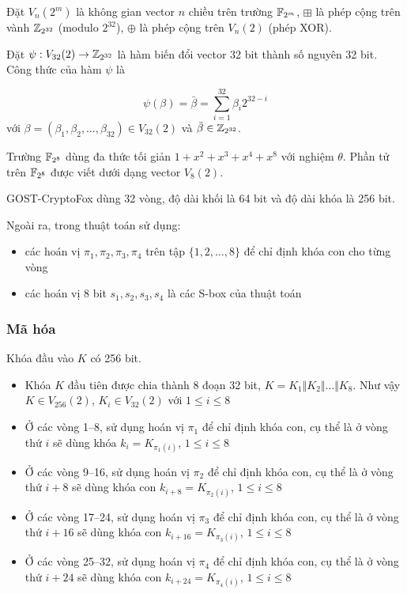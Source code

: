 Đặt $V_{n}(2^m)$ là không gian vector $n$ chiều trên trường $\mathbb{F}_{2^m}$, $\boxplus$ là phép cộng trên vành $\mathbb{Z}_{2^{32}}$ (modulo $2^{32}$), $\oplus$ là phép cộng trên $V_{n}(2)$ (phép XOR).

Đặt $\psi : V_{32}(2) \to \mathbb{Z}_{2^{32}}$ là hàm biến đổi vector 32 bit thành số nguyên 32 bit. Công thức của hàm $\psi$ là

\begin{equation*}
    \psi(\beta) = \bar{\beta} = \sum_{i=1}^{32} \beta_i 2^{32-i}
\end{equation*}
với $\beta = (\beta_1, \beta_2, \ldots, \beta_{32}) \in V_{32}(2)$ và $\bar{\beta} \in \mathbb{Z}_{2^{32}}$.

Trường $\mathbb{F}_{2^8}$ dùng đa thức tối giản $1 + x^2 + x^3 + x^4 + x^8$ với nghiệm $\theta$. Phần tử trên $\mathbb{F}_{2^8}$ được viết dưới dạng vector $V_8(2)$.

GOST-CryptoFox dùng 32 vòng, độ dài khối là 64 bit và độ dài khóa là 256 bit.

Ngoài ra, trong thuật toán sử dụng:

\begin{itemize}
    \item các hoán vị $\pi_1, \pi_2, \pi_3, \pi_4$ trên tập $\{ 1, 2, \ldots, 8 \}$ để chỉ định khóa con cho từng vòng
    \item các hoán vị 8 bit $s_1, s_2, s_3, s_4$ là các S-box của thuật toán
\end{itemize}

\subsubsection*{Mã hóa}

Khóa đầu vào $K$ có 256 bit.

\begin{itemize}
    \item Khóa $K$ đầu tiên được chia thành 8 đoạn 32 bit, $K = K_1 \Vert K_2 \Vert \ldots \Vert K_8$. Như vậy $K \in V_{256}(2)$, $K_i \in V_{32}(2)$ với $1 \leqslant i \leqslant 8$
    \item Ở các vòng 1--8, sử dụng hoán vị $\pi_1$ để chỉ định khóa con, cụ thể là ở vòng thứ $i$ sẽ dùng khóa $k_i = K_{\pi_1(i)}$, $1 \leqslant i \leqslant 8$
    \item Ở các vòng 9--16, sử dụng hoán vị $\pi_2$ để chỉ định khóa con, cụ thể là ở vòng thứ $i+8$ sẽ dùng khóa con $k_{i+8} = K_{\pi_2(i)}$, $1 \leqslant i \leqslant 8$
    \item Ở các vòng 17--24, sử dụng hoán vị $\pi_3$ để chỉ định khóa con, cụ thể là ở vòng thứ $i+16$ sẽ dùng khóa con $k_{i+16} = K_{\pi_3(i)}$, $1 \leqslant i \leqslant 8$
    \item Ở các vòng 25--32, sử dụng hoán vị $\pi_4$ để chỉ định khóa con, cụ thể là ở vòng thứ $i+24$ sẽ dùng khóa con $k_{i+24} =K_{\pi_4(i)}$, $1 \leqslant i \leqslant 8$
\end{itemize}